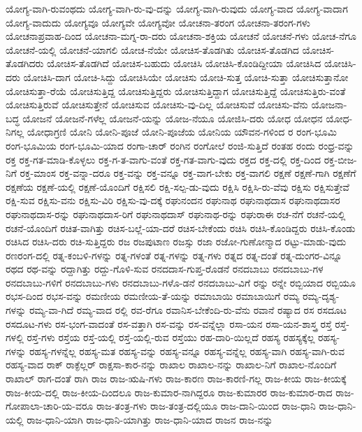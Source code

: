 {ಯೋಗ್ಯ-ವಾಗಿ-ರುವಂಥದು
ಯೋಗ್ಯ-ವಾಗಿ-ರು-ವು-ದನ್ನು
ಯೋಗ್ಯ-ವಾಗಿ-ರುವುದು
ಯೋಗ್ಯ-ವಾದ
ಯೋಗ್ಯ-ವಾದಾಗ
ಯೋಗ್ಯ-ವಾದುದು
ಯೋಗ್ಯವೂ
ಯೋಗ್ಯವೇ
ಯೋಗ್ಯವೋ
ಯೋಚನಾ-ತರಂಗ
ಯೋಚನಾ-ತರಂಗ-ಗಳು
ಯೋಚನಾಪ್ರವಾಹ-ದಿಂದ
ಯೋಚನಾ-ಮಗ್ನ-ರಾ-ದರು
ಯೋಚನಾ-ಶಕ್ತಿಯ
ಯೋಚನೆ
ಯೋಚನೆ-ಗಳು
ಯೋಚ-ನೆಗೂ
ಯೋಚನೆ-ಯಲ್ಲಿ
ಯೋಚನೆ-ಯಾಗಲಿ
ಯೋಚ-ನೆಯೇ
ಯೋಚಿಸ-ತೊಡಗಿತು
ಯೋಚಿಸ-ತೊಡಗಿದ
ಯೋಚಿಸ-ತೊಡಗಿದರು
ಯೋಚಿಸ-ತೊಡಗಿದೆ
ಯೋಚಿಸ-ಬಹುದು
ಯೋಚಿಸಿ
ಯೋಚಿಸಿ-ಕೊಂಡಿದ್ದೀಯಾ
ಯೋಚಿಸಿದ
ಯೋಚಿಸಿ-ದರು
ಯೋಚಿಸಿ-ದಾಗ
ಯೋಚಿ-ಸಿದ್ದು
ಯೋಚಿಸಿಯೇ
ಯೋಚಿಸು
ಯೋಚಿ-ಸುತ್ತ
ಯೋಚಿ-ಸುತ್ತಾ
ಯೋಚಿಸುತ್ತಾನೋ
ಯೋಚಿಸುತ್ತಾ-ರೆಯೆ
ಯೋಚಿಸುತ್ತಿದ್ದ
ಯೋಚಿಸುತ್ತಿದ್ದರು
ಯೋಚಿಸುತ್ತಿದ್ದಾಗ
ಯೋಚಿಸುತ್ತಿದ್ದೆ
ಯೋಚಿಸುತ್ತಿರು-ವಂತೆ
ಯೋಚಿಸುತ್ತಿರುವೆ
ಯೋಚಿಸುತ್ತೇನೆ
ಯೋಚಿಸುವ
ಯೋಚಿಸು-ವು-ದಿಲ್ಲ
ಯೋಚಿಸುವೆ
ಯೋಚಿಸು-ವೆನು
ಯೋಜನಾ-ಬದ್ಧ
ಯೋಜನೆ
ಯೋಜನೆ-ಗಳೆಲ್ಲ
ಯೋಜನೆ-ಯನ್ನು
ಯೋಜ-ನೆಯೂ
ಯೋಜಿಸಿ-ದರು
ಯೋಧ
ಯೋಧನ
ಯೋಧ-ನಿಗಲ್ಲ
ಯೋಧಾಗ್ರಣಿ
ಯೋನಿ
ಯೋನಿ-ಪೂಜೆ
ಯೋನಿ-ಪೂಜೆಯ
ಯೋನಿಯ
ಯೌವನ-ಗಳಿಂದ
ರ
ರಂಗ-ಭೂಮಿ
ರಂಗ-ಭೂಮಿಯ
ರಂಗ-ಭೂಮಿ-ಯಾದ
ರಂಗಾ-ಚಾರ್
ರಂಗಿನ
ರಂಗೋಲೆ
ರಂಜಿ-ಸುತ್ತಿದೆ
ರಂತಹ
ರಂದು
ರಂಧ್ರ-ವನ್ನು
ರಕ್ತ
ರಕ್ತ-ಗತ-ಮಾಡಿ-ಕೊಳ್ಳಲು
ರಕ್ತ-ಗ-ತ-ವಾಗು-ವಂತೆ
ರಕ್ತ-ಗತ-ವಾಗು-ವುದು
ರಕ್ತದ
ರಕ್ತ-ದಲ್ಲಿ
ರಕ್ತ-ದಿಂದ
ರಕ್ತ-ಬೀಜ-ನಿಗೆ
ರಕ್ತ-ಮಾಂಸ
ರಕ್ತ-ವನ್ನಾ-ದರೂ
ರಕ್ತ-ವನ್ನು
ರಕ್ತ-ವನ್ನೂ
ರಕ್ತ-ವಾಗ-ಬೇಕು
ರಕ್ತ-ವಾಗಲಿ
ರಕ್ಷಣೆ
ರಕ್ಷಣೆ-ಗಾಗಿ
ರಕ್ಷಣೆಗೆ
ರಕ್ಷಣೆಯ
ರಕ್ಷಣೆ-ಯಲ್ಲಿ
ರಕ್ಷಣೆ-ಯೊಂದಿಗೆ
ರಕ್ಷಿಸಲಿ
ರಕ್ಷಿ-ಸಲ್ಪ-ಡು-ವುದು
ರಕ್ಷಿಸಿ
ರಕ್ಷಿಸಿ-ರು-ವೆವು
ರಕ್ಷಿಸು
ರಕ್ಷಿಸುತ್ತೇವೆ
ರಕ್ಷಿ-ಸುವ
ರಕ್ಷಿಸು-ವನು
ರಕ್ಷಿಸು-ವಿರಿ
ರಕ್ಷಿಸು-ವು-ದಕ್ಕೆ
ರಘುನಂದನ
ರಘುನಾಥ
ರಘುನಾಥದಾಸ
ರಘುನಾಥದಾಸರ
ರಘುನಾಥದಾಸ-ರನ್ನು
ರಘುನಾಥದಾಸ-ರಿಗೆ
ರಘುನಾಥದಾಸ್
ರಘುನಾಥ-ರನ್ನು
ರಘುರಾಈ
ರಚ-ನೆಗೆ
ರಚನೆ-ಯಲ್ಲಿ
ರಚನೆ-ಯೊಂದಿಗೆ
ರಚಿತ-ವಾಗಿತ್ತು
ರಚಿಸ-ಬಲ್ಲೆ-ಯಾ-ದರೆ
ರಚಿಸ-ಬೇಕೆಂದು
ರಚಿಸಿ
ರಚಿಸಿ-ಕೊಂಡಿದ್ದರು
ರಚಿಸಿ-ಕೊಂಡು
ರಚಿಸಿದ
ರಚಿಸಿ-ದರು
ರಚಿ-ಸುತ್ತಿದ್ದರು
ರಜ
ರಜಪುಟಾಣ
ರಜಸ್ಸು
ರಜಾ
ರಜೋ-ಗುಣೋನ್ಮಾದ
ರಟ್ಟು-ಮಾಡು-ವುದು
ರಣರಂಗ-ದಲ್ಲಿ
ರತ್ನ-ಕಂಬಳಿ-ಗಳನ್ನು
ರತ್ನ-ಗಳಂತೆ
ರತ್ನ-ಗಳನ್ನು
ರತ್ನ-ಗಳು
ರತ್ನದ
ರತ್ನ-ದಂತೆ
ರತ್ನ-ದುಂಗರ-ವಿನ್ನೂ
ರಥದ
ರಥ-ವನ್ನು
ರದ್ದಾಗಿತ್ತು
ರದ್ದು-ಗೊಳಿ-ಸುವ
ರನದದಾಸ-ಗುಪ್ತ-ರೊಡನೆ
ರನದಬಾಬು
ರನದಬಾಬು-ಗಳ
ರನದಬಾಬು-ಗಳಿಗೆ
ರನದಬಾಬು-ಗಳು
ರನದಬಾಬು-ಗಳೊ-ಡನೆ
ರನದಬಾಬು-ವಿಗೆ
ರನ್ನು
ರನ್ನೇ
ರಬ್ಬಿಯಾದ
ರಬ್ಬಿಯೂ
ರಭಸ-ದಿಂದ
ರಭಸ-ವನ್ನು
ರಮಣೀಯ
ರಮಣೀಯ-ತೆ-ಯನ್ನು
ರಮಾಬಾಯಿ
ರಮಾಬಾಯಿಗೆ
ರಮ್ಯ
ರಮ್ಯ-ದೃಶ್ಯ-ಗಳನ್ನು
ರಮ್ಯ-ವಾ-ಗಿದೆ
ರಮ್ಯ-ವಾದ
ರಲ್ಲಿ
ರವ-ರೆಗೂ
ರವಾನಿಸ-ಬೇಕೆಂದಿ-ರು-ವೆನು
ರವಾನೆ
ರಷ್ಯಾದ
ರಸ
ರಸದೂಟ
ರಸದೂಟ-ಗಳು
ರಸ-ಭಂಗ-ವಾದಂತೆ
ರಸ-ವತ್ತಾಗಿ
ರಸ-ವನ್ನು
ರಸ-ವನ್ನೆಲ್ಲಾ
ರಸಾ-ಯನ
ರಸಾ-ಯನ-ಶಾಸ್ತ್ರ
ರಸ್ತೆ
ರಸ್ತೆ-ಗಳಲ್ಲಿ
ರಸ್ತೆ-ಗಳು
ರಸ್ತೆಯ
ರಸ್ತೆ-ಯಲ್ಲಿ
ರಸ್ತೆ-ಯಲ್ಲಿ-ರುವ
ರಸ್ತೆಯು
ರಹ-ದಾರಿ-ಯಿಲ್ಲದೆ
ರಹಸ್ಯ
ರಹಸ್ಯಕ್ಕೆಲ್ಲ
ರಹಸ್ಯ-ಗಳನ್ನು
ರಹಸ್ಯ-ಗಳನ್ನೆಲ್ಲ
ರಹಸ್ಯ-ಮತ
ರಹಸ್ಯ-ವನ್ನು
ರಹಸ್ಯ-ವನ್ನೂ
ರಹಸ್ಯ-ವನ್ನೆಲ್ಲ
ರಹಸ್ಯ-ವಾಗಿ
ರಹಸ್ಯ-ವಾಗಿ-ರುವ
ರಹಸ್ಯ-ವಾದ
ರಾಕ್
ರಾಕ್ಫೆಲ್ಲರ್
ರಾಕ್ಷಸಾ-ಕಾರ-ನನ್ನು
ರಾಖಾಲ
ರಾಖಾಲ-ನನ್ನು
ರಾಖಾಲ-ನಿಗೆ
ರಾಖಾಲ-ನೊಂದಿಗೆ
ರಾಖಾಲ್
ರಾಗ-ದಂತೆ
ರಾಗಿ
ರಾಜ
ರಾಜ-ಋಷಿ-ಗಳು
ರಾಜ-ಕಾರಣ
ರಾಜ-ಕಾರಣಿ-ಗಲ್ಲ
ರಾಜ-ಕೀಯ
ರಾಜ-ಕೀಯಕ್ಕೆ
ರಾಜ-ಕೀಯ-ದಲ್ಲಿ
ರಾಜ-ಕೀಯ-ದಿಂದಲೂ
ರಾಜ-ಕುಮಾರ-ನಾಗಿದ್ದರೂ
ರಾಜ-ಕುಮಾರರ
ರಾಜ-ಕುಮಾರ-ರಾದ
ರಾಜ-ಗೋಪಾಲಾ-ಚಾರಿ-ಯ-ವರೂ
ರಾಜ-ತಂತ್ರ-ಗಳು
ರಾಜ-ತಂತ್ರ-ದಲ್ಲಿಯೂ
ರಾಜ-ದಾನಿ-ಯಿಂದ
ರಾಜ-ಧಾನಿ
ರಾಜ-ಧಾನಿ-ಯಲ್ಲಿ
ರಾಜ-ಧಾನಿ-ಯಾಗಿ
ರಾಜ-ಧಾನಿ-ಯಾಗಿತ್ತು
ರಾಜ-ಧಾನಿ-ಯಾದ
ರಾಜನ
ರಾಜ-ನನ್ನು
}
